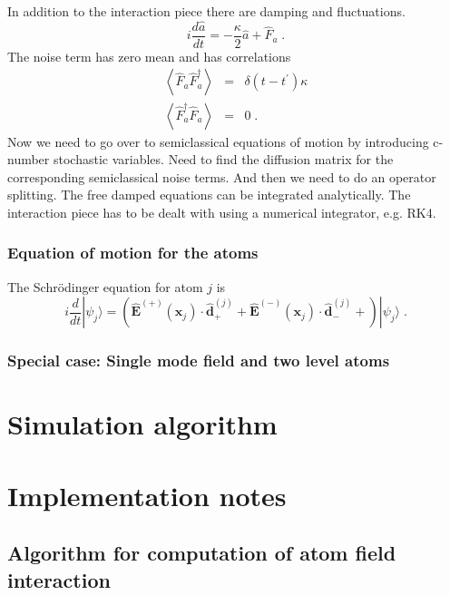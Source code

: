 \documentclass[aps, superscriptaddress, groupedaddress, preprint]{revtex4}
\renewcommand\vec{\mathbf}
\begin{document}
In addition to the interaction piece there are damping
and fluctuations.
\begin{equation}
i\frac{d\hat a}{dt}=
-\frac{\kappa}{2}\hat a + \hat F_a\;.
\end{equation}
The noise term has zero mean and has correlations
\begin{eqnarray}
\left<\hat F_a\hat F_a^\dagger\right>&=&\delta(t-t^\prime)\kappa\\
\left<\hat F_a^\dagger\hat F_a\right>&=&0\;.
\end{eqnarray}
Now we need to go over to semiclassical equations of motion by
introducing c-number stochastic variables.  Need to find the
diffusion matrix for the corresponding semiclassical noise terms.
And then we need to do an operator splitting.  The free damped
equations can be integrated analytically.  The interaction piece
has to be dealt with using a numerical integrator, e.g. RK4.


\subsubsection{Equation of motion for the atoms}

The Schr\"odinger equation for atom $j$ is
\begin{equation}
  i\frac{d}{dt}|\psi_j\rangle =
  \left(
    \vec{\hat E}^{(+)}(\vec{x}_j)\cdot \vec{\hat d}_+^{(j)} +
    \vec{\hat E}^{(-)}(\vec{x}_j)\cdot \vec{\hat d}_-^{(j)} +
  \right)
  |\psi_j\rangle\;.
\end{equation}


\subsubsection{Special case: Single mode field and  two level atoms}


\section{Simulation algorithm}

\section{Implementation notes}


\subsection{Algorithm for computation of atom field interaction}
\end{document}
